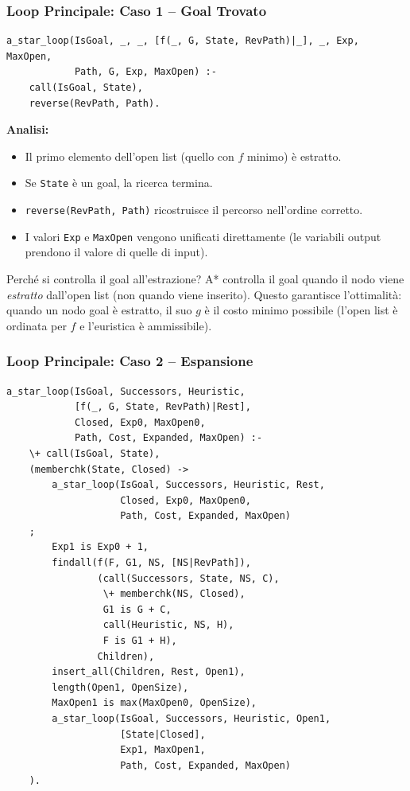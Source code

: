 \documentclass[12pt,a4paper]{article}
\begin{document}
\subsubsection{Loop Principale: Caso 1 -- Goal Trovato}

\begin{lstlisting}
a_star_loop(IsGoal, _, _, [f(_, G, State, RevPath)|_], _, Exp, MaxOpen,
            Path, G, Exp, MaxOpen) :-
    call(IsGoal, State),
    reverse(RevPath, Path).
\end{lstlisting}

\noindent\textbf{Analisi:}
\begin{itemize}[noitemsep]
  \item Il primo elemento dell'open list (quello con $f$ minimo) è estratto.
  \item Se \texttt{State} è un goal, la ricerca termina.
  \item \texttt{reverse(RevPath, Path)} ricostruisce il percorso nell'ordine corretto.
  \item I valori \texttt{Exp} e \texttt{MaxOpen} vengono unificati direttamente
        (le variabili output prendono il valore di quelle di input).
\end{itemize}

\begin{warnbox}{Perché si controlla il goal all'estrazione?}
A* controlla il goal quando il nodo viene \emph{estratto} dall'open list (non
quando viene inserito). Questo garantisce l'ottimalità: quando un nodo goal è
estratto, il suo $g$ è il costo minimo possibile (l'open list è ordinata per $f$
e l'euristica è ammissibile).
\end{warnbox}

\subsubsection{Loop Principale: Caso 2 -- Espansione}

\begin{lstlisting}
a_star_loop(IsGoal, Successors, Heuristic,
            [f(_, G, State, RevPath)|Rest],
            Closed, Exp0, MaxOpen0,
            Path, Cost, Expanded, MaxOpen) :-
    \+ call(IsGoal, State),
    (memberchk(State, Closed) ->
        a_star_loop(IsGoal, Successors, Heuristic, Rest,
                    Closed, Exp0, MaxOpen0,
                    Path, Cost, Expanded, MaxOpen)
    ;
        Exp1 is Exp0 + 1,
        findall(f(F, G1, NS, [NS|RevPath]),
                (call(Successors, State, NS, C),
                 \+ memberchk(NS, Closed),
                 G1 is G + C,
                 call(Heuristic, NS, H),
                 F is G1 + H),
                Children),
        insert_all(Children, Rest, Open1),
        length(Open1, OpenSize),
        MaxOpen1 is max(MaxOpen0, OpenSize),
        a_star_loop(IsGoal, Successors, Heuristic, Open1,
                    [State|Closed],
                    Exp1, MaxOpen1,
                    Path, Cost, Expanded, MaxOpen)
    ).
\end{lstlisting}
\end{document}
